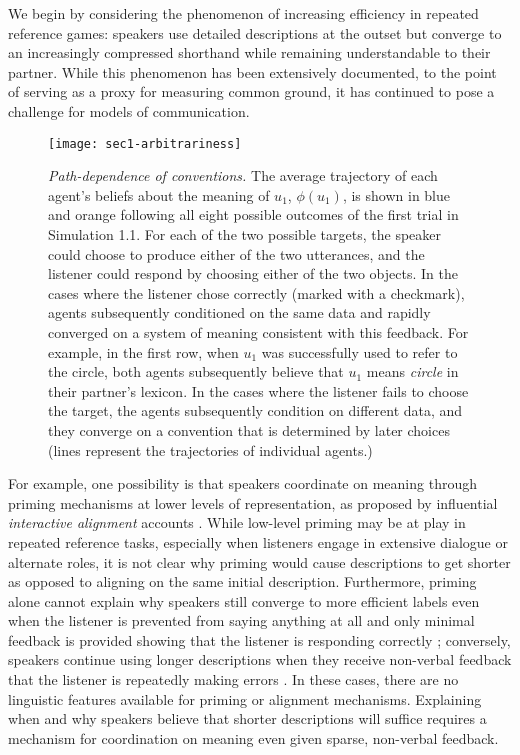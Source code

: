 We begin by considering the phenomenon of increasing efficiency in repeated reference games: speakers use detailed descriptions at the outset but converge to an increasingly compressed shorthand while remaining understandable to their partner.
While this phenomenon has been extensively documented, to the point of serving as a proxy for measuring common ground, it has continued to pose a challenge for models of communication.

  \begin{figure*}
\centering
    \texttt{[image: sec1-arbitrariness]}
    \vspace{1em}
    \caption{\emph{Path-dependence of conventions.} The average trajectory of each agent's beliefs about the meaning of $u_1$, $\phi(u_1)$, is shown in blue and orange following all eight possible outcomes of the first trial in Simulation 1.1. For each of the two possible targets, the speaker could choose to produce either of the two utterances, and the listener could respond by choosing either of the two objects. In the cases where the listener chose correctly (marked with a checkmark), agents subsequently conditioned on the same data and rapidly converged on a system of meaning consistent with this feedback. For example, in the first row, when $u_1$ was successfully used to refer to the circle, both agents subsequently believe that $u_1$ means \emph{circle} in their partner's lexicon. In the cases where the listener fails to choose the target, the agents subsequently condition on different data, and they converge on a convention that is determined by later choices (lines represent the trajectories of individual agents.)}
  \label{fig:path-dependence}
\end{figure*}

For example, one possibility is that speakers coordinate on meaning through priming mechanisms at lower levels of representation, as proposed by influential  \emph{interactive alignment} accounts \cite{pickering2004toward, pickering2006alignment, garrod2009joint}.
While low-level priming may be at play in repeated reference tasks, especially when listeners engage in extensive dialogue or alternate roles, it is not clear why priming would cause descriptions to get shorter as opposed to aligning on the same initial description.
Furthermore, priming alone cannot explain why speakers still converge to more efficient labels even when the listener is prevented from saying anything at all and only minimal feedback is provided showing that the listener is responding correctly \cite{KraussWeinheimer66_Tangrams}; conversely, speakers continue using longer descriptions when they receive non-verbal feedback that the listener is repeatedly making errors \cite<see also>{hawkins2020characterizing}.
In these cases, there are no linguistic features available for priming or alignment mechanisms.
Explaining when and why speakers believe that shorter descriptions will suffice requires a mechanism for coordination on meaning even given sparse, non-verbal feedback.


